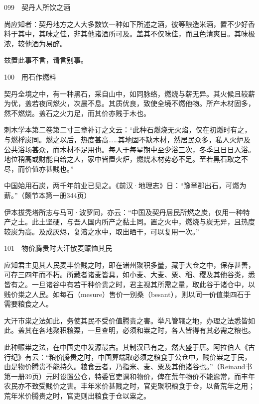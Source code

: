 \documentclass[12pt,UTF8]{ctexbook}
\begin{document}
099　契丹人所饮之酒

尚应知者：契丹地方之人大多数饮一种如下所述之酒，彼等酿造米酒，置不少好香料于其中，其味之佳，非其他诸酒所可及。盖其不仅味佳，而且色清爽目。其味极浓，较他酒为易醉。

兹置此事不言，请言别事。





100　用石作燃料

契丹全境之中，有一种黑石，采自山中，如同脉络，燃烧与薪无异。其火候且较薪为优，盖若夜间燃火，次晨不息。其质优良，致使全境不燃他物。所产木材固多，然不燃烧。盖石之火力足，而其价亦贱于木也。

剌木学本第二卷第二寸三章补订之文云：“此种石燃烧无火焰，仅在初燃时有之，与燃桴炭同。燃之以后，热度甚高……其地固不缺木材，然居民众多，私人火炉及公共浴场甚众，而木材不足用也。每人于每星期中至少浴三次，冬季且日日入浴。地位稍高或财能自给之人，家中皆置火炉，燃烧木材势必不足。至若黑石取之不尽，而价值亦甚贱也。”

中国始用石炭，两千年前业已见之。《前汉·地理志》日：“豫章郡出石，可燃为薪。”（颇节本第一册344页）

伊本拔秃塔所志与马可·波罗同，亦云：“中国及契丹居民所燃之炭，仅用一种特产之土。此土坚硬，与吾人国内所产之黏土同。置之火中，燃烧与炭无异，且热度较炭为高。及成灰烬，复溶之水中，取出晒干，可以复用一次。”





101　物价腾贵时大汗散麦赈恤其民

应知君主见其人民麦丰价贱之时，即在诸州聚积多量，藏于大仓之中，保存甚善，可存三四年而不朽。所藏者诸麦皆具，如小麦、大麦、粟、稻、稷及其他谷类，悉皆有之。一旦诸谷中有若干种价贵之时，君主视其所需之量，取此谷于诸仓中，以贱价粜之人民。如每石（mesure）售价一别桑（besant），则以同一价值粜四石于需要粮食之人。

大汗市粜之法如此，务使其民不受价值腾贵之害。举凡管辖之地，办理之法悉皆如此。盖其在各地聚积粮粟，一旦查明，必须和粜之时，各人皆得有其必需之粮也。

此种赈粜之法，在中国史中发源最古。其制汉已有之，然大盛于唐。阿拉伯人《古行纪》有云：“粮价腾贵之时，中国算端取必须之粮食于公仓中，贱价粜之于民，由是物价腾贵不能持久。粮食云者，乃指米、麦、粟及其他诸谷也。”（Reinaud书第一册39页）元时设置公仓，特委官吏调和物价，俾在荒年物价不能逾常，而丰年农民亦不致受贱价之害。丰年米价甚贱之时，官吏聚积粮食于仓，以备荒年之用；荒年米价腾贵之时，官吏则出粮食于仓以粜之。
\end{document}
